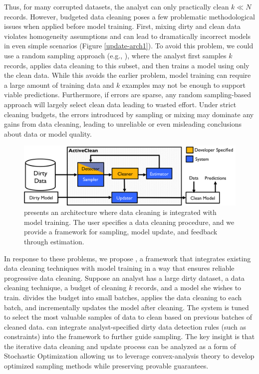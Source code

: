 Thus, for many corrupted datasets, the analyst can only practically clean $k \ll N$ records.
However, budgeted data cleaning poses a few problematic methodological issues when applied before model training.
First, mixing dirty and clean data violates homogeneity assumptions and can lead to dramatically incorrect models in even simple scenarios (Figure \ref{update-arch1}).
To avoid this problem, we could use a random sampling approach (e.g., \cite{wang1999sample}), where the analyst first samples $k$ records, applies data cleaning to this subset, and then trains a model using only the clean data.
While this avoids the earlier problem, model training can require a large amount of training data and $k$ examples may not be enough to support viable predictions.
Furthermore, if errors are sparse, any random sampling-based approach will largely select clean data leading to wasted effort.
Under strict cleaning budgets, the errors introduced by sampling or mixing may dominate any gains from data cleaning, leading to unreliable or even misleading conclusions about data or model quality.

\begin{figure}[t]
\centering
 \includegraphics[width=\columnwidth]{figs/arch.png}
 \caption{\sysfull presents an architecture where data cleaning is integrated with model training. The user specifies a data cleaning procedure, and we provide a framework for sampling, model update, and feedback through estimation. \label{sys-arch}}\vspace{-2em}
\end{figure}

In response to these problems, we propose \sys, a framework that integrates existing data cleaning techniques with model training in a way that ensures reliable progressive data cleaning.
Suppose an analyst has a large dirty dataset, a data cleaning technique, a budget of cleaning $k$ records, and a model she wishes to train.
\sys divides the budget into small batches, applies the data cleaning to each batch, and incrementally updates the model after cleaning.
The system is tuned to select the most valuable samples of data to clean based on previous batches of cleaned data. 
\sys can integrate analyst-specified dirty data detection rules (such as constraints) into the framework to further guide sampling.
The key insight is that the iterative data cleaning and update process can be analyzed as a form of Stochastic Optimization \cite{bertsekas2011incremental} allowing us to leverage convex-analysis theory to develop optimized sampling methods while preserving provable guarantees.

